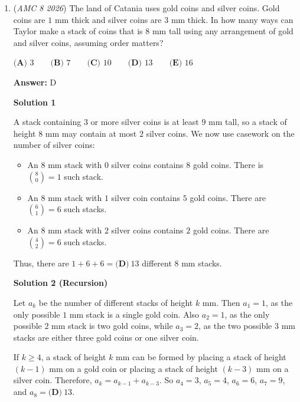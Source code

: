 \begin{enumerate}
 


	\item (\textit{AMC 8 2026}) The land of Catania uses gold coins and silver coins. Gold coins are $1$ mm thick and silver coins are $3$ mm thick. In how many ways can Taylor make a stack of coins that is $8$ mm tall using any arrangement of gold and silver coins, assuming order matters? 


 $\textbf{(A) } 3\qquad\textbf{(B) } 7\qquad\textbf{(C) } 10\qquad\textbf{(D) } 13\qquad\textbf{(E) } 16$

 \textbf{Answer: }D



\textbf{Solution 1}

A stack containing $3$ or more silver coins is at least $9$ mm tall, so a stack of height $8$ mm may contain at most $2$ silver coins. We now use casework on the number of silver coins:

 
            \begin{itemize}
        \item An $8$ mm stack with $0$ silver coins contains $8$ gold coins.  There is $\binom{8}{0} = 1$ such stack.
            \end{itemize}
            
            \begin{itemize}
        \item An $8$ mm stack with $1$ silver coin contains $5$ gold coins.  There are $\binom{6}{1} = 6$ such stacks.
            \end{itemize}
            
            \begin{itemize}
        \item An $8$ mm stack with $2$ silver coins contains $2$ gold coins.  There are $\binom{4}{2} = 6$ such stacks.
            \end{itemize}
            Thus, there are $1+6+6=\boxed{\textbf{(D)}\ 13}$ different $8$ mm stacks.  

 



\textbf{Solution 2 (Recursion)}

Let $a_k$ be the number of different stacks of height $k$ mm.  Then $a_1 = 1$, as the only possible $1$ mm stack is a single gold coin.  Also $a_2 = 1$, as the only possible $2$ mm stack is two gold coins, while $a_3 = 2$, as the two possible $3$ mm stacks are either three gold coins or one silver coin.

 If $k \geq 4$, a stack of height $k$ mm can be formed by placing a stack of height $(k - 1)$ mm on a gold coin or placing a stack of height $(k - 3)$ mm on a silver coin.  Therefore, $a_k = a_{k-1} + a_{k-3}$.  So $a_4 = 3$, $a_5 = 4$, $a_6 = 6$, $a_7 = 9$, and $a_8 = \boxed{\textbf{(D)}\ 13}$.


\end{enumerate}
